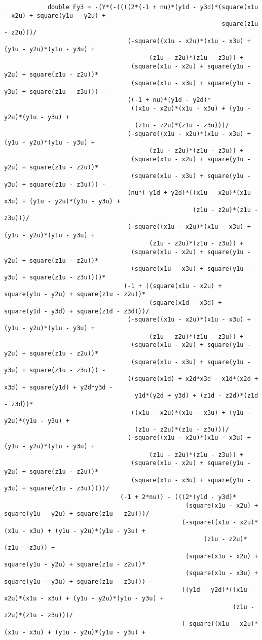 \begin{lstlisting}
			double Fy3 = -(Y*(-((((2*(-1 + nu)*(y1d - y3d)*(square(x1u - x2u) + square(y1u - y2u) + 
															square(z1u - z2u)))/
								  (-square((x1u - x2u)*(x1u - x3u) + (y1u - y2u)*(y1u - y3u) + 
										(z1u - z2u)*(z1u - z3u)) + 
								   (square(x1u - x2u) + square(y1u - y2u) + square(z1u - z2u))*
								   (square(x1u - x3u) + square(y1u - y3u) + square(z1u - z3u))) - 
								  ((-1 + nu)*(y1d - y2d)*
								   ((x1u - x2u)*(x1u - x3u) + (y1u - y2u)*(y1u - y3u) + 
									(z1u - z2u)*(z1u - z3u)))/
								  (-square((x1u - x2u)*(x1u - x3u) + (y1u - y2u)*(y1u - y3u) + 
										(z1u - z2u)*(z1u - z3u)) + 
								   (square(x1u - x2u) + square(y1u - y2u) + square(z1u - z2u))*
								   (square(x1u - x3u) + square(y1u - y3u) + square(z1u - z3u))) - 
								  (nu*(-y1d + y2d)*((x1u - x2u)*(x1u - x3u) + (y1u - y2u)*(y1u - y3u) + 
													(z1u - z2u)*(z1u - z3u)))/
								  (-square((x1u - x2u)*(x1u - x3u) + (y1u - y2u)*(y1u - y3u) + 
										(z1u - z2u)*(z1u - z3u)) + 
								   (square(x1u - x2u) + square(y1u - y2u) + square(z1u - z2u))*
								   (square(x1u - x3u) + square(y1u - y3u) + square(z1u - z3u))))*
								 (-1 + ((square(x1u - x2u) + square(y1u - y2u) + square(z1u - z2u))*
										(square(x1d - x3d) + square(y1d - y3d) + square(z1d - z3d)))/
								  (-square((x1u - x2u)*(x1u - x3u) + (y1u - y2u)*(y1u - y3u) + 
										(z1u - z2u)*(z1u - z3u)) + 
								   (square(x1u - x2u) + square(y1u - y2u) + square(z1u - z2u))*
								   (square(x1u - x3u) + square(y1u - y3u) + square(z1u - z3u))) - 
								  ((square(x1d) + x2d*x3d - x1d*(x2d + x3d) + square(y1d) + y2d*y3d - 
									y1d*(y2d + y3d) + (z1d - z2d)*(z1d - z3d))*
								   ((x1u - x2u)*(x1u - x3u) + (y1u - y2u)*(y1u - y3u) + 
									(z1u - z2u)*(z1u - z3u)))/
								  (-square((x1u - x2u)*(x1u - x3u) + (y1u - y2u)*(y1u - y3u) + 
										(z1u - z2u)*(z1u - z3u)) + 
								   (square(x1u - x2u) + square(y1u - y2u) + square(z1u - z2u))*
								   (square(x1u - x3u) + square(y1u - y3u) + square(z1u - z3u)))))/
								(-1 + 2*nu)) - (((2*(y1d - y3d)*
												  (square(x1u - x2u) + square(y1u - y2u) + square(z1u - z2u)))/
												 (-square((x1u - x2u)*(x1u - x3u) + (y1u - y2u)*(y1u - y3u) + 
													   (z1u - z2u)*(z1u - z3u)) + 
												  (square(x1u - x2u) + square(y1u - y2u) + square(z1u - z2u))*
												  (square(x1u - x3u) + square(y1u - y3u) + square(z1u - z3u))) - 
												 ((y1d - y2d)*((x1u - x2u)*(x1u - x3u) + (y1u - y2u)*(y1u - y3u) + 
															   (z1u - z2u)*(z1u - z3u)))/
												 (-square((x1u - x2u)*(x1u - x3u) + (y1u - y2u)*(y1u - y3u) + 

\end{lstlisting}
